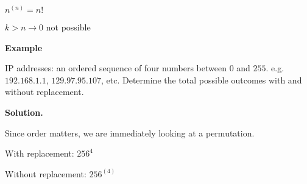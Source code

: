 $ n^{(n)}=n! $

$ k>n\rightarrow 0 $ not possible

\textbf{Example}

IP addresses: an ordered sequence of four numbers between $ 0 $ and $ 255 $.
e.g. $ 192.168.1.1 $, $ 129.97.95.107 $, etc. Determine the
total possible outcomes with and without replacement.

\textbf{Solution.}

Since order matters, we are immediately looking at a permutation.

With replacement: $ 256^4 $

Without replacement: $ 256^{(4)} $
